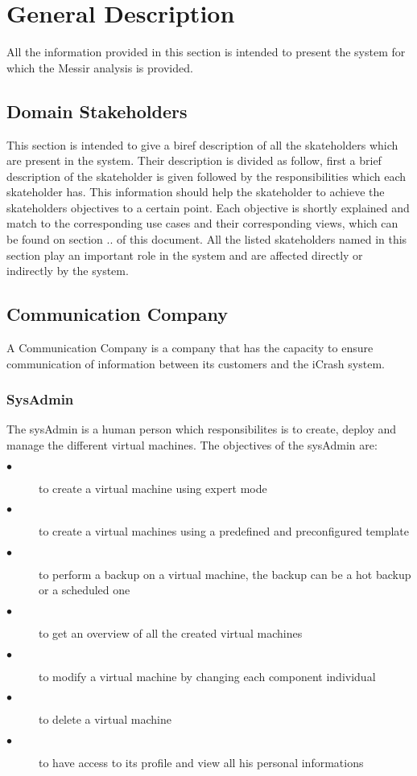 
\chapter{General Description}
\label{chap:general_description}

All the information provided in this section is intended to present the system
for which the Messir analysis is provided. 

\section{Domain Stakeholders}
\label{sec:icrash-gendescr-stakeholders}

This section is intended to give a biref description of all the skateholders
which are present in the system. Their description is divided as follow, first a
brief description of the skateholder is given followed by the responsibilities
which each skateholder has. This information should help the skateholder to
achieve the skateholders objectives to a certain point. Each objective is
shortly explained and match to the corresponding use cases and their
corresponding views, which can be found on section .. of this document. All the
listed skateholders named in this section play an important role in the system
and are affected directly or indirectly by the system.

\newpage

\section{Communication Company}

A Communication Company is a company that has the capacity to ensure communication of
information between its customers and the iCrash system.

\subsection{SysAdmin}

The sysAdmin is a human person which responsibilites is to create, deploy and
manage the different virtual machines. The objectives of the sysAdmin are:
\begin{description}
\item[$\bullet$] to create a virtual machine using expert mode
\item[$\bullet$] to create a virtual machines using a predefined and
preconfigured template
\item[$\bullet$] to perform a backup on a virtual machine, the backup can be a
hot backup or a scheduled one
\item[$\bullet$] to get an overview of all the created virtual machines
\item[$\bullet$] to modify a virtual machine by changing each component
individual
\item[$\bullet$] to delete a virtual machine
\item[$\bullet$] to have access to its profile and view all his personal
informations
\end{description}
